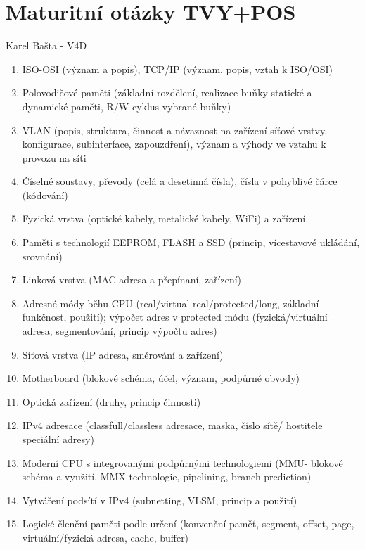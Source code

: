 \documentclass[a4paper,11pt]{article}
\begin{document}
    
    \section*{Maturitní otázky TVY+POS}
        \begin{center}
            \Large Karel Bašta - V4D
        \end{center}
        \begin{enumerate}
            \item ISO-OSI (význam a popis), TCP/IP (význam, popis, vztah k ISO/OSI)
            \item Polovodičové paměti (základní rozdělení, realizace buňky statické a dynamické paměti, R/W cyklus vybrané buňky)
            \item VLAN (popis, struktura, činnost a návaznost na zařízení síťové vrstvy, konfigurace, subinterface, zapouzdření), význam a výhody ve vztahu k provozu na síti
            \item Číselné soustavy, převody (celá a desetinná čísla), čísla v pohyblivé čárce (kódování)
            \item Fyzická vrstva (optické kabely, metalické kabely, WiFi) a zařízení
            \item Paměti s technologií EEPROM, FLASH a SSD (princip, vícestavové ukládání, srovnání)
            \item Linková vrstva (MAC adresa a přepínaní, zařízení)
            \item Adresné módy běhu CPU (real/virtual real/protected/long, základní funkčnost, použití); výpočet adres v protected módu (fyzická/virtuální adresa, segmentování, princip výpočtu adres)
            \item Síťová vrstva (IP adresa, směrování a zařízení)
            \item Motherboard (blokové schéma, účel, význam, podpůrné obvody)
            \item Optická zařízení (druhy, princip činnosti) 
            \item IPv4 adresace (classfull/classless adresace, maska, číslo sítě/ hostitele speciální adresy)
            \item Moderní CPU s integrovanými podpůrnými technologiemi (MMU- blokové schéma a využití, MMX technologie, pipelining, branch prediction)
            \item Vytváření podsítí v IPv4 (subnetting, VLSM, princip a použití)
            \item Logické členění paměti podle určení (konvenční paměť, segment, offset, page, virtuální/fyzická adresa, cache, buffer)

\end{enumerate}
\end{document}
